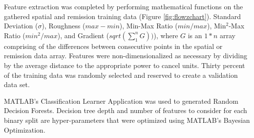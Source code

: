 \documentclass[journal,onecolumn]{IEEEtran}
\begin{document}


	{Feature extraction was completed by performing mathematical functions on the gathered spatial and remission training data (Figure \ref{fig:flowzchart}). Standard Deviation ($\sigma$), Roughness ($max - min$), Min-Max Ratio ($min / max$), Min$^{2}$-Max Ratio ($min^2 / max$), and Gradient ($sqrt(\sum_{1}^{n} G))$), where $G$ is an $1*n$ array comprising of the differences between consecutive points in the spatial or remission data array. Features were non-dimensionalized as necessary by dividing by the average distance to the appropriate power to cancel units. Thirty percent of the training data was randomly selected and reserved to create a validation data set.} 
	
	{MATLAB's Classification Learner Application was used to generated Random Decision Forests. Decision tree depth and number of features to consider for each binary split are hyper-parameters that were optimized using MATLAB's Bayesian Optimization.}
	
\end{document}
